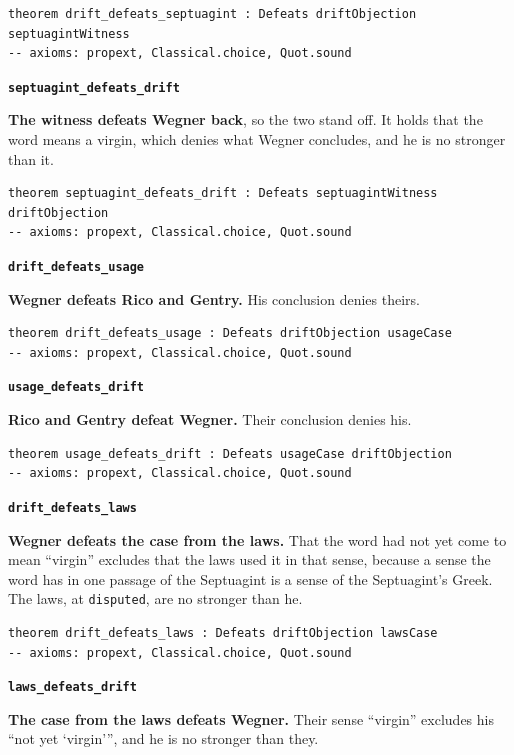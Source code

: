 \documentclass[11pt]{article}
\begin{document}
{\small\begin{verbatim}
theorem drift_defeats_septuagint : Defeats driftObjection septuagintWitness
-- axioms: propext, Classical.choice, Quot.sound
\end{verbatim}}
\par\medskip\noindent\textbf{\texttt{septuagint\_\allowbreak{}defeats\_\allowbreak{}drift}}\par\nobreak\noindent
\textbf{The witness defeats Wegner back}, so the two stand off. It holds that the word means a virgin, which denies what Wegner concludes, and he is no stronger than it.

{\small\begin{verbatim}
theorem septuagint_defeats_drift : Defeats septuagintWitness driftObjection
-- axioms: propext, Classical.choice, Quot.sound
\end{verbatim}}
\par\medskip\noindent\textbf{\texttt{drift\_\allowbreak{}defeats\_\allowbreak{}usage}}\par\nobreak\noindent
\textbf{Wegner defeats Rico and Gentry.} His conclusion denies theirs.

{\small\begin{verbatim}
theorem drift_defeats_usage : Defeats driftObjection usageCase
-- axioms: propext, Classical.choice, Quot.sound
\end{verbatim}}
\par\medskip\noindent\textbf{\texttt{usage\_\allowbreak{}defeats\_\allowbreak{}drift}}\par\nobreak\noindent
\textbf{Rico and Gentry defeat Wegner.} Their conclusion denies his.

{\small\begin{verbatim}
theorem usage_defeats_drift : Defeats usageCase driftObjection
-- axioms: propext, Classical.choice, Quot.sound
\end{verbatim}}
\par\medskip\noindent\textbf{\texttt{drift\_\allowbreak{}defeats\_\allowbreak{}laws}}\par\nobreak\noindent
\textbf{Wegner defeats the case from the laws.} That the word had not yet come to mean “virgin” excludes that the laws used it in that sense, because a sense the word has in one passage of the Septuagint is a sense of the Septuagint’s Greek. The laws, at \texttt{disputed}, are no stronger than he.

{\small\begin{verbatim}
theorem drift_defeats_laws : Defeats driftObjection lawsCase
-- axioms: propext, Classical.choice, Quot.sound
\end{verbatim}}
\par\medskip\noindent\textbf{\texttt{laws\_\allowbreak{}defeats\_\allowbreak{}drift}}\par\nobreak\noindent
\textbf{The case from the laws defeats Wegner.} Their sense “virgin” excludes his “not yet ‘virgin’”, and he is no stronger than they.
\end{document}
